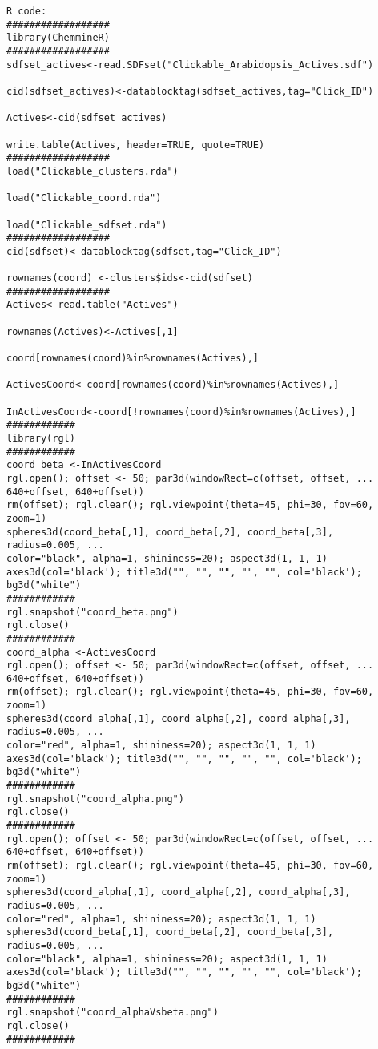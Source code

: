 \begin{verbatim}
R code:
##################
library(ChemmineR)
##################
sdfset_actives<-read.SDFset("Clickable_Arabidopsis_Actives.sdf")

cid(sdfset_actives)<-datablocktag(sdfset_actives,tag="Click_ID")

Actives<-cid(sdfset_actives)

write.table(Actives, header=TRUE, quote=TRUE)
##################
load("Clickable_clusters.rda")

load("Clickable_coord.rda")

load("Clickable_sdfset.rda")
##################
cid(sdfset)<-datablocktag(sdfset,tag="Click_ID")

rownames(coord) <-clusters$ids<-cid(sdfset)
##################
Actives<-read.table("Actives")

rownames(Actives)<-Actives[,1]

coord[rownames(coord)%in%rownames(Actives),]

ActivesCoord<-coord[rownames(coord)%in%rownames(Actives),]

InActivesCoord<-coord[!rownames(coord)%in%rownames(Actives),]
############
library(rgl)
############
coord_beta <-InActivesCoord
rgl.open(); offset <- 50; par3d(windowRect=c(offset, offset, ...
640+offset, 640+offset))
rm(offset); rgl.clear(); rgl.viewpoint(theta=45, phi=30, fov=60, zoom=1)
spheres3d(coord_beta[,1], coord_beta[,2], coord_beta[,3], radius=0.005, ...
color="black", alpha=1, shininess=20); aspect3d(1, 1, 1)
axes3d(col='black'); title3d("", "", "", "", "", col='black'); bg3d("white") 
############
rgl.snapshot("coord_beta.png")
rgl.close()
############
coord_alpha <-ActivesCoord
rgl.open(); offset <- 50; par3d(windowRect=c(offset, offset, ...
640+offset, 640+offset))
rm(offset); rgl.clear(); rgl.viewpoint(theta=45, phi=30, fov=60, zoom=1)
spheres3d(coord_alpha[,1], coord_alpha[,2], coord_alpha[,3], radius=0.005, ...
color="red", alpha=1, shininess=20); aspect3d(1, 1, 1)
axes3d(col='black'); title3d("", "", "", "", "", col='black'); bg3d("white") 
############
rgl.snapshot("coord_alpha.png")
rgl.close()
############
rgl.open(); offset <- 50; par3d(windowRect=c(offset, offset, ...
640+offset, 640+offset))
rm(offset); rgl.clear(); rgl.viewpoint(theta=45, phi=30, fov=60, zoom=1)
spheres3d(coord_alpha[,1], coord_alpha[,2], coord_alpha[,3], radius=0.005, ...
color="red", alpha=1, shininess=20); aspect3d(1, 1, 1)
spheres3d(coord_beta[,1], coord_beta[,2], coord_beta[,3], radius=0.005, ...
color="black", alpha=1, shininess=20); aspect3d(1, 1, 1)
axes3d(col='black'); title3d("", "", "", "", "", col='black'); bg3d("white") 
############
rgl.snapshot("coord_alphaVsbeta.png")
rgl.close()
############
\end{verbatim}

